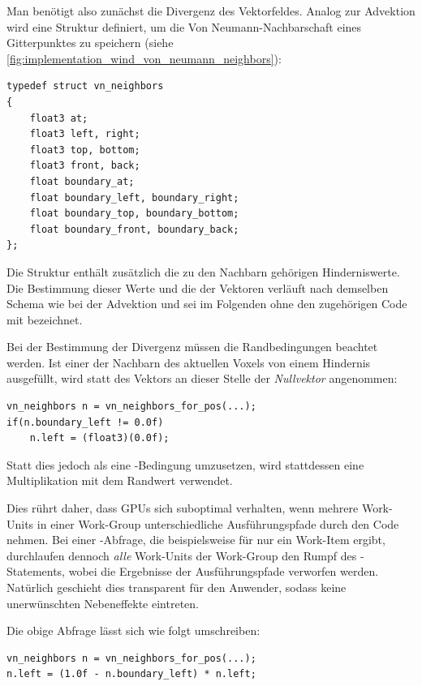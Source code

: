 Man benötigt also zunächst die Divergenz des Vektorfeldes. Analog zur
Advektion wird eine Struktur definiert, um die Von
Neumann-Nachbarschaft eines Gitterpunktes zu speichern (siehe
\cref{fig:implementation_wind_von_neumann_neighbors}):

\begin{verbatim}
typedef struct vn_neighbors
{
    float3 at;
    float3 left, right;
    float3 top, bottom;
    float3 front, back;
    float boundary_at;
    float boundary_left, boundary_right;
    float boundary_top, boundary_bottom;
    float boundary_front, boundary_back;
};
\end{verbatim}

Die Struktur enthält zusätzlich die zu den Nachbarn gehörigen
Hinderniswerte. Die Bestimmung dieser Werte und die der Vektoren
verläuft nach demselben Schema wie bei der Advektion und sei im
Folgenden ohne den zugehörigen Code mit
  bezeichnet.

Bei der Bestimmung der Divergenz müssen die Randbedingungen beachtet
werden. Ist einer der Nachbarn des aktuellen Voxels von einem
Hindernis ausgefüllt, wird statt des Vektors an dieser Stelle der
\emph{Nullvektor} angenommen:
\begin{verbatim}
vn_neighbors n = vn_neighbors_for_pos(...);
if(n.boundary_left != 0.0f)
    n.left = (float3)(0.0f);
\end{verbatim}
Statt dies jedoch als eine -Bedingung
umzusetzen, wird stattdessen eine Multiplikation mit dem Randwert
verwendet.

Dies rührt daher, dass GPUs sich suboptimal verhalten, wenn mehrere
Work-Units in einer Work-Group unterschiedliche Ausführungspfade durch
den Code nehmen. Bei einer -Abfrage, die
beispielsweise für nur ein Work-Item  ergibt,
durchlaufen dennoch \emph{alle} Work-Units der Work-Group den Rumpf
des -Statements, wobei die Ergebnisse der
 Ausführungspfade verworfen werden. Natürlich
geschieht dies transparent für den Anwender, sodass keine
unerwünschten Nebeneffekte eintreten.

Die obige Abfrage lässt sich wie folgt umschreiben:

\begin{verbatim}
vn_neighbors n = vn_neighbors_for_pos(...);
n.left = (1.0f - n.boundary_left) * n.left;
\end{verbatim}

